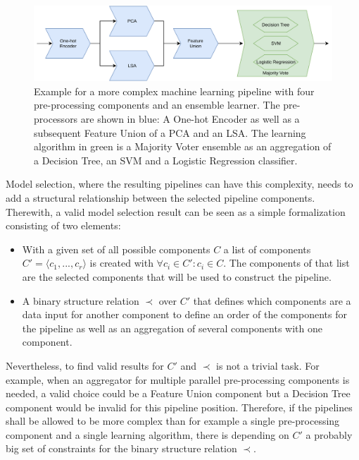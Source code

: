 \begin{figure}[ht!]
    \centering
    \includegraphics[width=\textwidth]{gfx/Figures/Theory/ComplexPipeline.pdf}
    \caption[Example for a more complex machine learning pipeline.]{Example for a more complex machine learning pipeline with four pre-processing components and an ensemble learner. The pre-processors are shown in blue: A One-hot Encoder as well as a subsequent Feature Union of a PCA and an LSA. The learning algorithm in green is a Majority Voter ensemble as an aggregation of a Decision Tree, an SVM and a Logistic Regression classifier.}
	\label{fig:theory:complexPipeline}
\end{figure}

Model selection, where the resulting pipelines can have this complexity, needs to add a structural relationship between the selected pipeline components.
Therewith, a valid model selection result can be seen as a simple formalization consisting of two elements:
\begin{itemize}
    \item With a given set of all possible components $C$ a list of components $C' = \langle c_1, ..., c_r\rangle$ is created with $\forall c_i \in C' : c_i \in C$.
    The components of that list are the selected components that will be used to construct the pipeline.
    \item A binary structure relation $\prec$ over $C'$ that defines which components are a data input for another component to define an order of the components for the pipeline as well as an aggregation of several components with one component. 
\end{itemize}
Nevertheless, to find valid results for $C'$ and $\prec$ is not a trivial task.
For example, when an aggregator for multiple parallel pre-processing components is needed, a valid choice could be a Feature Union component but a Decision Tree component would be invalid for this pipeline position.\newline
Therefore, if the pipelines shall be allowed to be more complex than for example a single pre-processing component and a single learning algorithm, there is depending on $C'$ a probably big set of constraints for the binary structure relation $\prec$.

